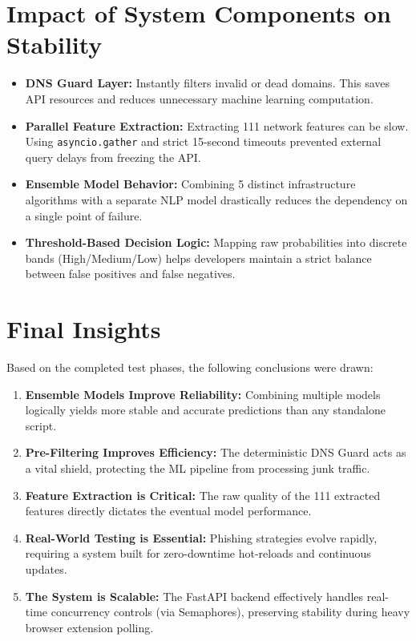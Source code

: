 \section{Impact of System Components on Stability}

\begin{itemize}
    \item \textbf{DNS Guard Layer:}
    Instantly filters invalid or dead domains. This saves API resources and reduces unnecessary machine learning computation.

    \item \textbf{Parallel Feature Extraction:}
    Extracting 111 network features can be slow. Using \texttt{asyncio.gather} and strict 15-second timeouts prevented external query delays from freezing the API.

    \item \textbf{Ensemble Model Behavior:}
    Combining 5 distinct infrastructure algorithms with a separate NLP model drastically reduces the dependency on a single point of failure.

    \item \textbf{Threshold-Based Decision Logic:}
    Mapping raw probabilities into discrete bands (High/Medium/Low) helps developers maintain a strict balance between false positives and false negatives.
\end{itemize}

\section{Final Insights}
\noindent
Based on the completed test phases, the following conclusions were drawn:

\begin{enumerate}
    \item \textbf{Ensemble Models Improve Reliability:} Combining multiple models logically yields more stable and accurate predictions than any standalone script.
    \item \textbf{Pre-Filtering Improves Efficiency:} The deterministic DNS Guard acts as a vital shield, protecting the ML pipeline from processing junk traffic.
    \item \textbf{Feature Extraction is Critical:} The raw quality of the 111 extracted features directly dictates the eventual model performance.
    \item \textbf{Real-World Testing is Essential:} Phishing strategies evolve rapidly, requiring a system built for zero-downtime hot-reloads and continuous updates.
    \item \textbf{The System is Scalable:} The FastAPI backend effectively handles real-time concurrency controls (via Semaphores), preserving stability during heavy browser extension polling.
\end{enumerate}
